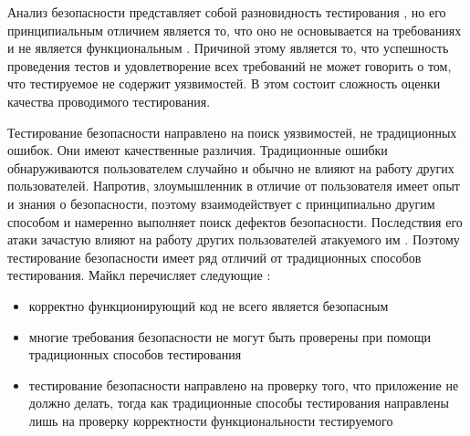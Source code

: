 %
Анализ безопасности  представляет собой разновидность тестирования , но его принципиальным отличием является то, что оно не основывается на требованиях и не является функциональным . 
%
Причиной этому является то, что успешность проведения тестов и удовлетворение всех требований не может говорить о том, что тестируемое  не содержит уязвимостей. 
%
В этом состоит сложность оценки качества проводимого тестирования. 

%
Тестирование безопасности  направлено на поиск уязвимостей, не традиционных ошибок.
% 
Они имеют качественные различия. 
%
Традиционные ошибки обнаруживаются пользователем случайно и обычно не влияют на работу других пользователей.
%
Напротив, злоумышленник в отличие от пользователя имеет опыт и знания о безопасности, поэтому взаимодействует с  принципиально другим способом и намеренно выполняет поиск дефектов безопасности. 
%
Последствия его атаки зачастую влияют на работу других пользователей атакуемого им .
%
Поэтому тестирование безопасности  имеет ряд отличий от традиционных способов тестирования. Майкл перечисляет следующие :
\begin{itemize}
	\setlength{\itemsep}{0pt}%

	\item корректно функционирующий код не всего является безопасным
	
	\item многие требования безопасности не могут быть проверены при помощи традиционных способов тестирования 

	\item тестирование безопасности  направлено на проверку того, что приложение не должно делать, тогда как традиционные способы тестирования  направлены лишь на проверку корректности функциональности тестируемого 
\end{itemize}

